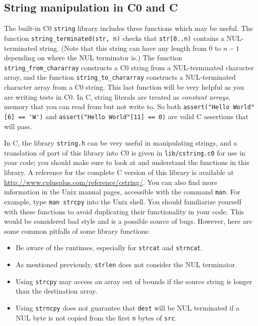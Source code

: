 \documentclass[12pt]{exam}
\begin{document}
\subsection{String manipulation in C0 and C}

The built-in C0 \lstinline'string' library includes three functions
which may be useful. The function %
\lstinline'string_terminated(str, n)' %
checks that \lstinline'str[0..n)' contains a NUL-terminated
string. (Note that this string can have any length from $0$ to $n-1$
depending on where the NUL terminator is.) The function
\lstinline'string_from_chararray' constructs a C0 string from a
NUL-terminated character array, and the function
\lstinline'string_to_chararray' constructs a NUL-terminated character
array from a C0 string. This last function will be very helpful as you
are writing tests in C0. In C, string literals are treated as
\emph{constant arrays}, memory that you can read from but not write
to.  So both \lstinline|assert("Hello World"[6] == 'W')| and
\lstinline|assert("Hello World"[11] == 0)| are valid C assertions that
will pass.

In C, the library \lstinline[deletekeywords={string}]'string.h' can be
very useful in manipulating strings, and a translation of part of this
library into C0 is given in \lstinline'lib/cstring.c0' for use in your
code; you should make sure to look at and understand the functions in
this library. A reference for the complete C version of this library
is available at \url{http://www.cplusplus.com/reference/cstring/}.
You can also find more information in the Unix manual pages,
accessible with the command \lstinline'man'. For example, type %
\lstinline'man strcpy' %
into the Unix shell. You should familiarize yourself with these
functions to avoid duplicating their functionality in your code. This
would be considered bad style and is a possible source of
bugs. However, here are some common pitfalls of some library
functions:
\begin{itemize}
\item%
  Be aware of the runtimes, especially for \lstinline'strcat' and
  \lstinline'strncat'.
\item%
  As mentioned previously, \lstinline'strlen' does not consider the
  NUL terminator.
\item%
  Using \lstinline'strcpy' may access an array out of bounds if the
  source string is longer than the destination array.
\item%
  Using \lstinline'strncpy' does not guarantee that \lstinline'dest'
  will be NUL terminated if a NUL byte is not copied from the first
  \lstinline'n' bytes of \lstinline'src'.
\end{itemize}
\end{document}

